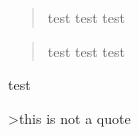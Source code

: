 \begin{quote}test test
test

\end{quote}
\begin{quote}test
test
test

\end{quote}
test

>this is not a quote

